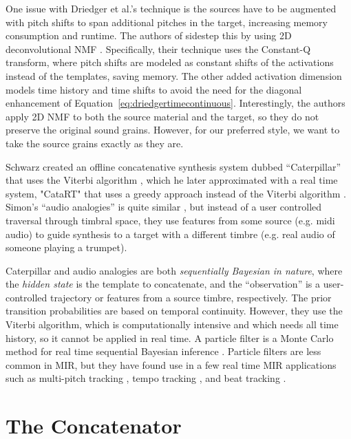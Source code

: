 \documentclass{article}
\begin{document}
One issue with Driedger et al.'s technique is the sources have to be augmented with pitch shifts to span additional pitches in the target, increasing memory consumption and runtime.  The authors of \cite{foroughmand2017multi, aarabi2018music} sidestep this by using 2D deconvolutional NMF \cite{schmidt2006nonnegative}.  Specifically, their technique uses the Constant-Q transform, where pitch shifts are modeled as constant shifts of the activations instead of the templates, saving memory.  The other added activation dimension models time history and time shifts to avoid the need for the diagonal enhancement of Equation~\ref{eq:driedgertimecontinuous}.  Interestingly, the authors apply 2D NMF to both the source material and the target, so they do not preserve the original sound grains.  However, for our preferred style, we want to take the source grains exactly as they are.



Schwarz created an offline concatenative synthesis system dubbed ``Caterpillar'' that uses the Viterbi algorithm \cite{schwarz2000system}, which he later approximated with a real time system, "CataRT" that uses a greedy approach instead of the Viterbi algorithm \cite{schwarz2006real, schwarz2008principles}.  Simon's ``audio analogies'' is quite similar \cite{simon2005audio}, but instead of a user controlled traversal through timbral space, they use features from some source (e.g. midi audio) to guide synthesis to a target with a different timbre (e.g. real audio of someone playing a trumpet).

Caterpillar and audio analogies are both {\em sequentially Bayesian in nature}, where the {\em hidden state} is the template to concatenate, and the ``observation'' is a user-controlled trajectory or features from a source timbre, respectively.  The prior transition probabilities are based on temporal continuity.  However, they use the Viterbi algorithm, which is computationally intensive and which needs all time history, so it cannot be applied in real time.  A particle filter is a Monte Carlo method for real time sequential Bayesian inference \cite{metropolis1949monte, doucet2000sequential, thrun2002probabilistic}.  Particle filters are less common in MIR, but they have found use in a few real time MIR applications such as multi-pitch tracking \cite{duan2011state}, tempo tracking \cite{cemgil2003monte, hainsworth2004particle}, and beat tracking \cite{heydari2021don}.  

\section{The Concatenator}
\end{document}
